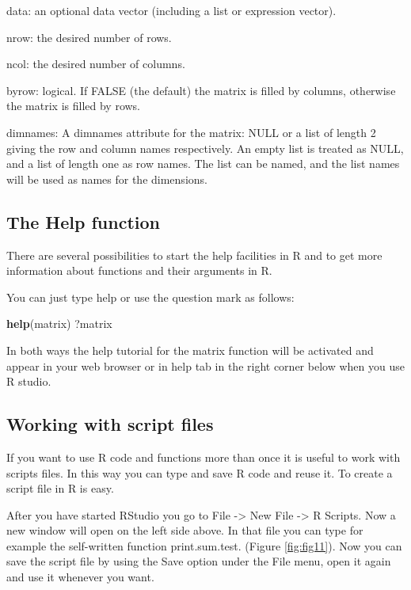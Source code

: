 \documentclass[]{book}
\newenvironment{Shaded}{\begin{snugshade}}{\end{snugshade}}
\newcommand{\KeywordTok}[1]{\textcolor[rgb]{0.13,0.29,0.53}{\textbf{#1}}}
\newcommand{\NormalTok}[1]{#1}
\theoremstyle{definition}
\theoremstyle{definition}
\theoremstyle{definition}
\theoremstyle{remark}
\begin{document}
data: an optional data vector (including a list or expression vector).

nrow: the desired number of rows.

ncol: the desired number of columns.

byrow: logical. If FALSE (the default) the matrix is filled by columns,
otherwise the matrix is filled by rows.

dimnames: A dimnames attribute for the matrix: NULL or a list of length
2 giving the row and column names respectively. An empty list is treated
as NULL, and a list of length one as row names. The list can be named,
and the list names will be used as names for the dimensions.

\subsection{The Help function}\label{the-help-function}

There are several possibilities to start the help facilities in R and to
get more information about functions and their arguments in R.

You can just type help or use the question mark as follows:

\begin{Shaded}
\begin{Highlighting}[]
\KeywordTok{help}\NormalTok{(matrix)}
\NormalTok{?matrix}
\end{Highlighting}
\end{Shaded}

In both ways the help tutorial for the matrix function will be activated
and appear in your web browser or in help tab in the right corner below
when you use R studio.

\subsection{Working with script files}\label{working-with-script-files}

If you want to use R code and functions more than once it is useful to
work with scripts files. In this way you can type and save R code and
reuse it. To create a script file in R is easy.

After you have started RStudio you go to File -\textgreater{} New File
-\textgreater{} R Scripts. Now a new window will open on the left side
above. In that file you can type for example the self-written function
print.sum.test. (Figure \ref{fig:fig11}). Now you can save the script
file by using the Save option under the File menu, open it again and use
it whenever you want.
\end{document}
